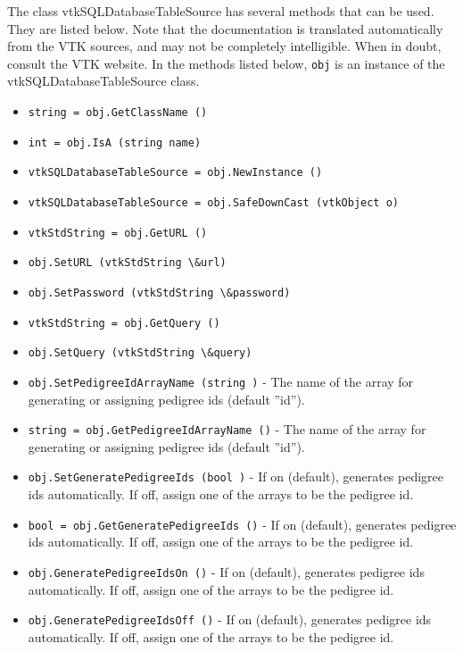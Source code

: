 The class vtkSQLDatabaseTableSource has several methods that can be used.
  They are listed below.
Note that the documentation is translated automatically from the VTK sources,
and may not be completely intelligible.  When in doubt, consult the VTK website.
In the methods listed below, \verb|obj| is an instance of the vtkSQLDatabaseTableSource class.
\begin{itemize}
\item  \verb|string = obj.GetClassName ()|

\item  \verb|int = obj.IsA (string name)|

\item  \verb|vtkSQLDatabaseTableSource = obj.NewInstance ()|

\item  \verb|vtkSQLDatabaseTableSource = obj.SafeDownCast (vtkObject o)|

\item  \verb|vtkStdString = obj.GetURL ()|

\item  \verb|obj.SetURL (vtkStdString \&url)|

\item  \verb|obj.SetPassword (vtkStdString \&password)|

\item  \verb|vtkStdString = obj.GetQuery ()|

\item  \verb|obj.SetQuery (vtkStdString \&query)|

\item  \verb|obj.SetPedigreeIdArrayName (string )| -  The name of the array for generating or assigning pedigree ids
 (default ''id'').

\item  \verb|string = obj.GetPedigreeIdArrayName ()| -  The name of the array for generating or assigning pedigree ids
 (default ''id'').

\item  \verb|obj.SetGeneratePedigreeIds (bool )| -  If on (default), generates pedigree ids automatically.
 If off, assign one of the arrays to be the pedigree id.

\item  \verb|bool = obj.GetGeneratePedigreeIds ()| -  If on (default), generates pedigree ids automatically.
 If off, assign one of the arrays to be the pedigree id.

\item  \verb|obj.GeneratePedigreeIdsOn ()| -  If on (default), generates pedigree ids automatically.
 If off, assign one of the arrays to be the pedigree id.

\item  \verb|obj.GeneratePedigreeIdsOff ()| -  If on (default), generates pedigree ids automatically.
 If off, assign one of the arrays to be the pedigree id.

\end{itemize}
